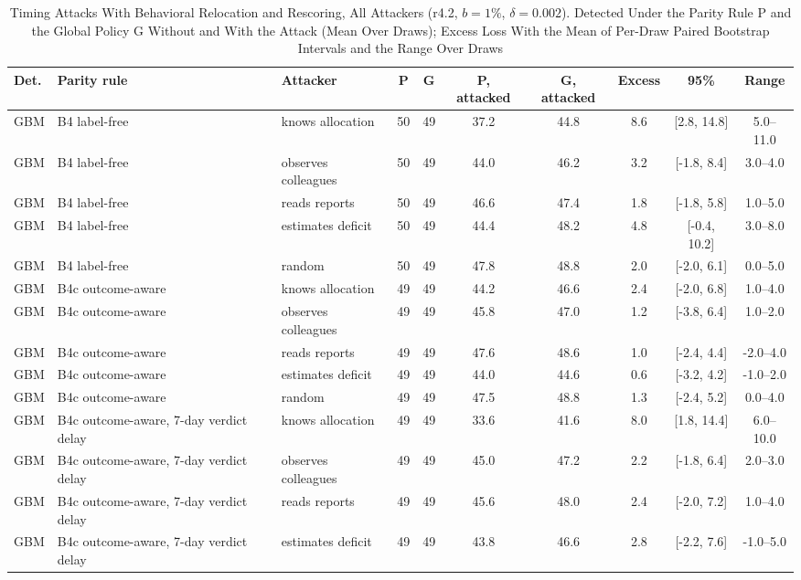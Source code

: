 \begin{table}[!t]
\caption{Timing Attacks With Behavioral Relocation and Rescoring, All Attackers (r4.2, $b=1\%$, $\delta=0.002$). Detected Under the Parity Rule P and the Global Policy G Without and With the Attack (Mean Over Draws); Excess Loss With the Mean of Per-Draw Paired Bootstrap Intervals and the Range Over Draws\label{tab:e-l1-r42}}
\centering
\scriptsize
\setlength{\tabcolsep}{3pt}
\begin{tabular}{lllccccccc}
\toprule
Det. & Parity rule & Attacker & P & G & P, attacked & G, attacked & Excess & 95\% & Range \\
\midrule
GBM & B4 label-free & knows allocation & 50 & 49 & 37.2 & 44.8 & 8.6 & [2.8, 14.8] & 5.0--11.0 \\
GBM & B4 label-free & observes colleagues & 50 & 49 & 44.0 & 46.2 & 3.2 & [-1.8, 8.4] & 3.0--4.0 \\
GBM & B4 label-free & reads reports & 50 & 49 & 46.6 & 47.4 & 1.8 & [-1.8, 5.8] & 1.0--5.0 \\
GBM & B4 label-free & estimates deficit & 50 & 49 & 44.4 & 48.2 & 4.8 & [-0.4, 10.2] & 3.0--8.0 \\
GBM & B4 label-free & random & 50 & 49 & 47.8 & 48.8 & 2.0 & [-2.0, 6.1] & 0.0--5.0 \\
GBM & B4c outcome-aware & knows allocation & 49 & 49 & 44.2 & 46.6 & 2.4 & [-2.0, 6.8] & 1.0--4.0 \\
GBM & B4c outcome-aware & observes colleagues & 49 & 49 & 45.8 & 47.0 & 1.2 & [-3.8, 6.4] & 1.0--2.0 \\
GBM & B4c outcome-aware & reads reports & 49 & 49 & 47.6 & 48.6 & 1.0 & [-2.4, 4.4] & -2.0--4.0 \\
GBM & B4c outcome-aware & estimates deficit & 49 & 49 & 44.0 & 44.6 & 0.6 & [-3.2, 4.2] & -1.0--2.0 \\
GBM & B4c outcome-aware & random & 49 & 49 & 47.5 & 48.8 & 1.3 & [-2.4, 5.2] & 0.0--4.0 \\
GBM & B4c outcome-aware, 7-day verdict delay & knows allocation & 49 & 49 & 33.6 & 41.6 & 8.0 & [1.8, 14.4] & 6.0--10.0 \\
GBM & B4c outcome-aware, 7-day verdict delay & observes colleagues & 49 & 49 & 45.0 & 47.2 & 2.2 & [-1.8, 6.4] & 2.0--3.0 \\
GBM & B4c outcome-aware, 7-day verdict delay & reads reports & 49 & 49 & 45.6 & 48.0 & 2.4 & [-2.0, 7.2] & 1.0--4.0 \\
GBM & B4c outcome-aware, 7-day verdict delay & estimates deficit & 49 & 49 & 43.8 & 46.6 & 2.8 & [-2.2, 7.6] & -1.0--5.0 \\

\end{tabular}
\end{table}
